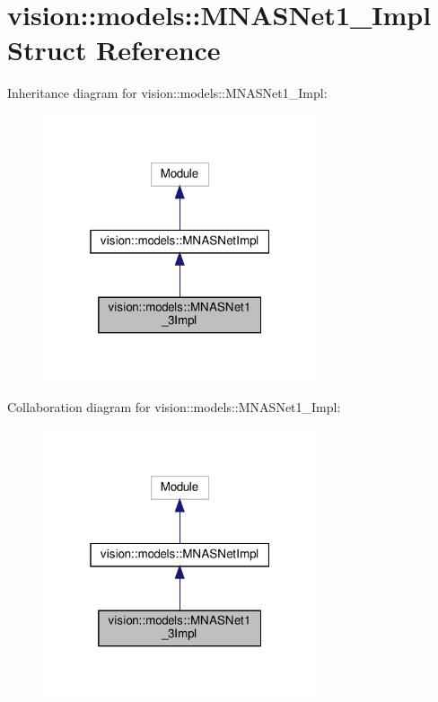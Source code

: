\hypertarget{structvision_1_1models_1_1MNASNet1__3Impl}{}\section{vision\+:\+:models\+:\+:M\+N\+A\+S\+Net1\+\_\+Impl Struct Reference}
\label{structvision_1_1models_1_1MNASNet1__3Impl}


Inheritance diagram for vision\+:\+:models\+:\+:M\+N\+A\+S\+Net1\+\_\+Impl\+:
\nopagebreak
\begin{figure}[H]
\begin{center}
\leavevmode
\includegraphics[width=229pt]{structvision_1_1models_1_1MNASNet1__3Impl__inherit__graph}
\end{center}
\end{figure}


Collaboration diagram for vision\+:\+:models\+:\+:M\+N\+A\+S\+Net1\+\_\+Impl\+:
\nopagebreak
\begin{figure}[H]
\begin{center}
\leavevmode
\includegraphics[width=229pt]{structvision_1_1models_1_1MNASNet1__3Impl__coll__graph}
\end{center}
\end{figure}
